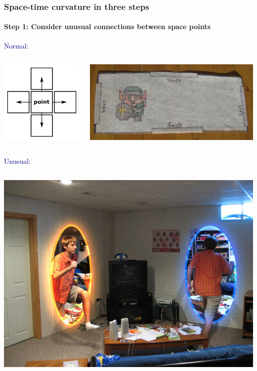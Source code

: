 \documentclass[compress]{beamer}
\begin{document}
\begin{frame}
\frametitle{Space-time curvature in three steps}
\framesubtitle{Step 1: Consider unusual connections between space points}

\vspace{1 cm}
\textcolor{darkblue}{\Large Normal:}

\vspace{-1.5 cm}
\begin{columns}
\hfill \includegraphics[width=2 cm]{pictures/normal_connections.png}

\includegraphics[width=\linewidth]{pictures/dungeon_room.jpg}
\end{columns}

\textcolor{darkblue}{\Large Unusual:}

\vspace{0.25 cm}
\begin{columns}
\includegraphics[width=\linewidth]{pictures/fanart_portal179.jpg}


\end{columns}
\end{frame}
\end{document}
